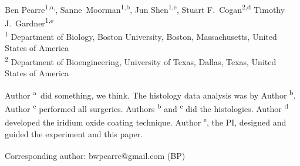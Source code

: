\documentclass[10pt,letterpaper]{article}
\date{}
\begin{document}
\vspace*{0.35in}

\begin{flushleft}
{\Large
  \textbf{}
}
\newline
\\
Ben Pearre\textsuperscript{1,a,\textcurrency},
Sanne~Moorman\textsuperscript{1,b},
Jun Shen\textsuperscript{1,c},
Stuart F.~Cogan\textsuperscript{2,d}
Timothy J.~Gardner\textsuperscript{1,e}
\\
\bigskip
\textsuperscript{1} Department of Biology, Boston University, Boston, Massachusetts, United States of America\\
\textsuperscript{2} Department of Bioengineering, University of Texas, Dallas, Texas, United States of America
\\
\bigskip

% 
%
Author \textsuperscript{a}~did something, we think.  The histology data analysis was by Author \textsuperscript{b}. Author \textsuperscript{c} performed all surgeries.  Authors \textsuperscript{b} and \textsuperscript{c} did the histologies.  Author \textsuperscript{d} developed the iridium oxide coating technique.  Author \textsuperscript{e}, the PI, designed and guided the experiment and this paper.





\textsuperscript{\textcurrency} Corresponding author: bwpearre@gmail.com (BP)

\end{flushleft}
\end{document}
